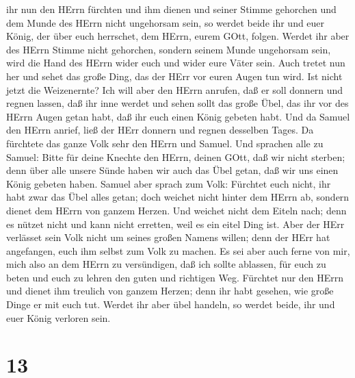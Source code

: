 ihr nun den HErrn fürchten und ihm dienen und seiner Stimme gehorchen
und dem Munde des HErrn nicht ungehorsam sein, so werdet beide ihr und
euer König, der über euch herrschet, dem HErrn, eurem GOtt, folgen.
 Werdet ihr aber des HErrn Stimme nicht gehorchen, sondern
seinem Munde ungehorsam sein, wird die Hand des HErrn wider euch und
wider eure Väter sein.  Auch tretet nun her und sehet das
große Ding, das der HErr vor euren Augen tun wird.  Ist
nicht jetzt die Weizenernte? Ich will aber den HErrn anrufen, daß er
soll donnern und regnen lassen, daß ihr inne werdet und sehen sollt das
große Übel, das ihr vor des HErrn Augen getan habt, daß ihr euch einen
König gebeten habt.  Und da Samuel den HErrn anrief, ließ
der HErr donnern und regnen desselben Tages. Da fürchtete das ganze Volk
sehr den HErrn und Samuel.  Und sprachen alle zu Samuel:
Bitte für deine Knechte den HErrn, deinen GOtt, daß wir nicht sterben;
denn über alle unsere Sünde haben wir auch das Übel getan, daß wir uns
einen König gebeten haben.  Samuel aber sprach zum Volk:
Fürchtet euch nicht, ihr habt zwar das Übel alles getan; doch weichet
nicht hinter dem HErrn ab, sondern dienet dem HErrn von ganzem Herzen.
 Und weichet nicht dem Eiteln nach; denn es nützet nicht
und kann nicht erretten, weil es ein eitel Ding ist.  Aber
der HErr verlässet sein Volk nicht um seines großen Namens willen; denn
der HErr hat angefangen, euch ihm selbst zum Volk zu machen.
 Es sei aber auch ferne von mir, mich also an dem HErrn zu
versündigen, daß ich sollte ablassen, für euch zu beten und euch zu
lehren den guten und richtigen Weg.  Fürchtet nur den HErrn
und dienet ihm treulich von ganzem Herzen; denn ihr habt gesehen, wie
große Dinge er mit euch tut.  Werdet ihr aber übel handeln,
so werdet beide, ihr und euer König verloren sein.

\hypertarget{section-12}{%
\section{13}\label{section-12}}


